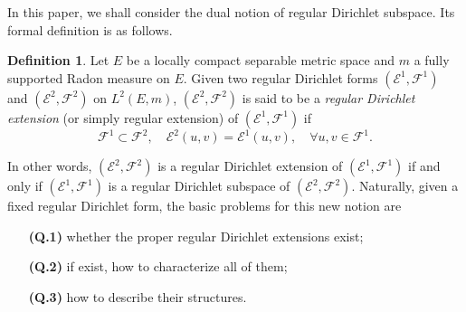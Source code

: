 \documentclass[a4paper]{amsart}
\theoremstyle{definition}
\newtheorem{definition}[theorem]{Definition}
\theoremstyle{remark}
\numberwithin{equation}{section}
\begin{document}
In this paper, we shall consider the dual notion of regular Dirichlet subspace. Its formal definition is as follows.

\begin{definition}
Let $E$ be a locally compact separable metric space and $m$ a fully supported Radon measure on $E$. Given two regular Dirichlet forms $({{\mathcal{E}}}^1,{{\mathcal{F}}}^1)$ and $({{\mathcal{E}}}^2,{{\mathcal{F}}}^2)$ on $L^2(E,m)$, $({{\mathcal{E}}}^2,{{\mathcal{F}}}^2)$ is said to be a \emph{regular Dirichlet extension} (or simply regular extension) of $({{\mathcal{E}}}^1,{{\mathcal{F}}}^1)$ if
\begin{equation}\label{EQ1FFE}
	{{\mathcal{F}}}^1\subset {{\mathcal{F}}}^2, \quad {{\mathcal{E}}}^2(u,v)={{\mathcal{E}}}^1(u,v),\quad \forall u,v\in {{\mathcal{F}}}^1.
\end{equation}
\end{definition}

In other words, $({{\mathcal{E}}}^2,{{\mathcal{F}}}^2)$ is a regular Dirichlet extension of $({{\mathcal{E}}}^1,{{\mathcal{F}}}^1)$ if and only if $({{\mathcal{E}}}^1,{{\mathcal{F}}}^1)$ is a regular Dirichlet subspace of $({{\mathcal{E}}}^2,{{\mathcal{F}}}^2)$.
Naturally, given a fixed regular Dirichlet form, the basic problems for this new notion are
\begin{itemize}
\item[\textbf{(Q.1)}] whether the proper regular Dirichlet extensions exist;
\item[\textbf{(Q.2)}] if exist, how to characterize all of them;
\item[\textbf{(Q.3)}] how to describe their structures.
\end{itemize}
\end{document}
